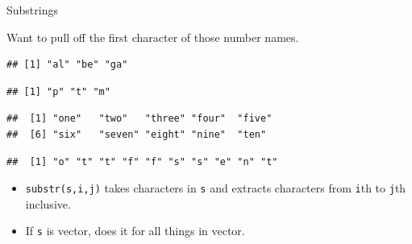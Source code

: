 \begin{frame}[fragile]{Substrings}
  
Want to pull off the first character of those number names.




\begin{knitrout}
\color{fgcolor}\begin{kframe}
\begin{alltt}
\hlkwb{=}\hlstd{(}\hlstd{,}\hlstd{,}\hlstd{)}
\hlstd{,}\hlstd{)}
\end{alltt}
\begin{verbatim}
## [1] "al" "be" "ga"
\end{verbatim}
\begin{alltt}
\hlstd{,}\hlstd{)}
\end{alltt}
\begin{verbatim}
## [1] "p" "t" "m"
\end{verbatim}
\begin{alltt}
\hlopt{$}
\end{alltt}
\begin{verbatim}
##  [1] "one"   "two"   "three" "four"  "five" 
##  [6] "six"   "seven" "eight" "nine"  "ten"
\end{verbatim}
\begin{alltt}
\hlopt{$}\hlstd{,}\hlstd{)}
\end{alltt}
\begin{verbatim}
##  [1] "o" "t" "t" "f" "f" "s" "s" "e" "n" "t"
\end{verbatim}
\end{kframe}
\end{knitrout}

\begin{itemize}
\item 
\texttt{substr(s,i,j)} takes characters in \texttt{s} and extracts characters
from \texttt{i}th to \texttt{j}th inclusive. 
\item If \texttt{s} is vector, does it for all things in vector.
\end{itemize}
  
\end{frame}

